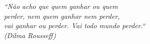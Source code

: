 
\begin{epigrafe}
	\vspace*{\fill}
	\begin{flushright}
		\textit{``Não acho que quem ganhar ou quem\\
		perder, nem quem ganhar nem perder, \\
		vai ganhar ou perder. Vai todo mundo perder.``\\
		(Dilma Rousseff)
		}
	\end{flushright}
\end{epigrafe}